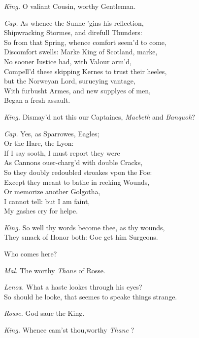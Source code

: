 \documentclass[12pt]{sides}
\newcommand{\dia}[1]{\hskip 10pt\textit{#1}\hskip 6pt}
\begin{document}
\begin{multicols}{2}
			\dia{King.} O valiant Cousin, worthy Gentleman.
			
			\dia{Cap.} As whence the Sunne 'gins his reflection, \\ Shipwracking Stormes, and direfull Thunders: \\ So from that Spring, whence comfort seem'd to come, \\ Discomfort swells: Marke King of Scotland, marke, \\ No sooner Iustice had, with Valour arm'd, \\ Compell'd these skipping Kernes to trust their heeles, \\ but the Norweyan Lord, surueying vantage, \\ With furbusht Armes, and new supplyes of men, \\ Began a fresh assault.
			
			\dia{King.} Dismay'd not this our Captaines, \textit{Macbeth} and \textit{Banquoh}?
			
			\dia{Cap.} Yes, as Sparrowes, Eagles; \\ Or the Hare, the Lyon: \\ If I say sooth, I must report they were \\ As Cannons ouer-charg'd with double Cracks, \\ So they doubly redoubled stroakes vpon the Foe: \\ Except they meant to bathe in reeking Wounds, \\ Or memorize another Golgotha, \\ I cannot tell: but I am faint, \\ My gashes cry for helpe.
			
			\dia{King.} So well thy words become thee, as thy wounds, \\ They smack of Honor both: Goe get him Surgeons.
			
			Who comes here?
			
			\dia{Mal.} The worthy \textit{Thane} of Rosse.
			 
			\dia{Lenox.} What a haste lookes through his eyes? \\ So should he looke, that seemes to speake things strange.
			
			\dia{Rosse.} God saue the King.
			
			\dia{King.} Whence cam'st thou,worthy \textit{Thane} ?
			

\end{multicols}
\end{document}
